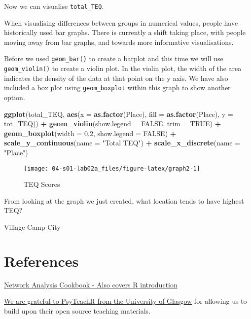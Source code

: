 \documentclass[]{book}
\newenvironment{Shaded}{\begin{snugshade}}{\end{snugshade}}
\newcommand{\KeywordTok}[1]{\textcolor[rgb]{0.13,0.29,0.53}{\textbf{#1}}}
\newcommand{\DataTypeTok}[1]{\textcolor[rgb]{0.13,0.29,0.53}{#1}}
\newcommand{\FloatTok}[1]{\textcolor[rgb]{0.00,0.00,0.81}{#1}}
\newcommand{\StringTok}[1]{\textcolor[rgb]{0.31,0.60,0.02}{#1}}
\newcommand{\OtherTok}[1]{\textcolor[rgb]{0.56,0.35,0.01}{#1}}
\newcommand{\OperatorTok}[1]{\textcolor[rgb]{0.81,0.36,0.00}{\textbf{#1}}}
\newcommand{\NormalTok}[1]{#1}
\begin{document}
Now we can visualise \texttt{total\_TEQ}.

When visualising differences between groups in numerical values, people
have historically used bar graphs. There is currently a shift taking
place, with people moving away from bar graphs, and towards more
informative visualisations.

Before we used \texttt{geom\_bar()} to create a barplot and this time we
will use \texttt{geom\_violin()} to create a violin plot. In the violin
plot, the width of the area indicates the density of the data at that
point on the y axis. We have also included a box plot using
\texttt{geom\_boxplot} within this graph to show another option.

\begin{Shaded}
\begin{Highlighting}[]
\KeywordTok{ggplot}\NormalTok{(total_TEQ, }\KeywordTok{aes}\NormalTok{(}\DataTypeTok{x =} \KeywordTok{as.factor}\NormalTok{(Place), }\DataTypeTok{fill =} \KeywordTok{as.factor}\NormalTok{(Place), }\DataTypeTok{y =}\NormalTok{ tot_TEQ)) }\OperatorTok{+}\StringTok{ }\KeywordTok{geom_violin}\NormalTok{(}\DataTypeTok{show.legend =} \OtherTok{FALSE}\NormalTok{, }\DataTypeTok{trim =} \OtherTok{TRUE}\NormalTok{) }\OperatorTok{+}
\StringTok{  }\KeywordTok{geom_boxplot}\NormalTok{(}\DataTypeTok{width =} \FloatTok{0.2}\NormalTok{, }\DataTypeTok{show.legend =} \OtherTok{FALSE}\NormalTok{) }\OperatorTok{+}
\StringTok{  }\KeywordTok{scale_y_continuous}\NormalTok{(}\DataTypeTok{name =} \StringTok{"Total TEQ"}\NormalTok{) }\OperatorTok{+}
\StringTok{  }\KeywordTok{scale_x_discrete}\NormalTok{(}\DataTypeTok{name =} \StringTok{"Place"}\NormalTok{)}
\end{Highlighting}
\end{Shaded}

\begin{figure}

{\centering \texttt{[image: 04-s01-lab02a\_files/figure-latex/graph2-1]} 

}

\caption{TEQ Scores}\label{fig:graph2}
\end{figure}

From looking at the graph we just created, what location tends to have
highest TEQ?

 Village Camp City

\appendix


\chapter{References}\label{references}

\href{http://sachaepskamp.com/files/Cookbook.html}{Network Analysis
Cookbook - Also covers R introduction}

\href{https://psyteachr.github.io/}{We are grateful to PsyTeachR from
the University of Glasgow} for allowing us to build upon their open
source teaching materials.


\end{document}
